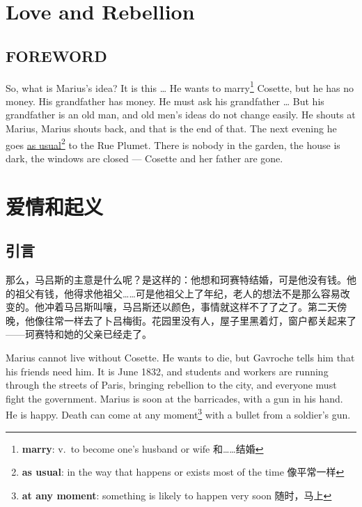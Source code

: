 \documentclass[fontset=ubuntu, zihao=5]{ctexart}
\begin{document}
\begin{paracol}{2}

\section{Love and Rebellion}

\subsection*{FOREWORD}

So, what is Marius's idea? It is this \ldots{} He wants to
marry\footnote{\textbf{marry}: v. to become one's husband or wife 和……结婚}
Cosette, but he has no money. His grandfather has money. He must ask his
grandfather \ldots{} But his grandfather is an old man, and old men's ideas
do not change easily. He shouts at Marius, Marius shouts back, and that is
the end of that. The next evening he goes \uline{as usual}\footnote{\textbf{as
    usual}: in the way that happens or exists most of the time 像平常一样}
to the Rue Plumet. There is nobody in the garden, the house is dark, the
windows are closed --- Cosette and her father are gone.

\switchcolumn

\section*{爱情和起义}

\subsection*{引言}

那么，马吕斯的主意是什么呢？是这样的：他想和珂赛特结婚，可是他没有钱。他的祖父有钱，他得求他祖父……可是他祖父上了年纪，老人的想法不是那么容易改变的。他冲着马吕斯叫嚷，马吕斯还以颜色，事情就这样不了了之了。第二天傍晚，他像往常一样去了卜吕梅街。花园里没有人，屋子里黑着灯，窗户都关起来了——珂赛特和她的父亲已经走了。

\switchcolumn*

Marius cannot live without Cosette. He wants to die, but Gavroche tells him
that his friends need him. It is June 1832, and students and workers are
running through the streets of Paris, bringing rebellion to the city, and
everyone must fight the government. Marius is soon at the barricades, with a
gun in his hand. He is happy. Death can come at any
moment\footnote{\textbf{at any moment}: something is likely to happen very
  soon 随时，马上} with a bullet from a soldier's gun.



\end{paracol}
\end{document}

